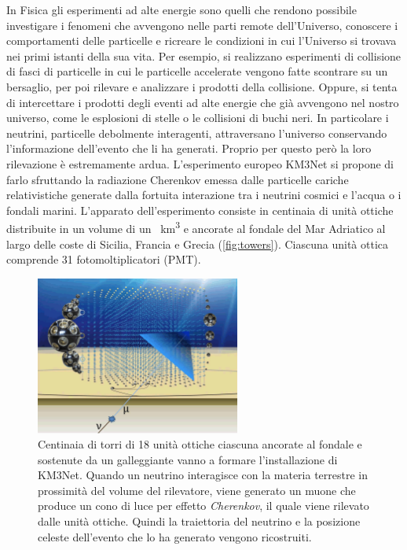 \documentclass[../main.tex]{subfiles}
\begin{document}
In Fisica gli esperimenti ad alte energie sono quelli che rendono possibile investigare i fenomeni che avvengono nelle parti remote dell'Universo, conoscere i comportamenti delle particelle e ricreare le condizioni in cui l'Universo si trovava nei primi istanti della sua vita. Per esempio, si realizzano esperimenti di collisione di fasci di particelle in cui le particelle accelerate vengono fatte scontrare su un bersaglio, per poi rilevare e analizzare i prodotti della collisione. Oppure, si tenta di intercettare i prodotti degli eventi ad alte energie che già avvengono nel nostro universo, come le esplosioni di stelle o le collisioni di buchi neri. In particolare i neutrini, particelle debolmente interagenti, attraversano l'universo conservando l'informazione dell'evento che li ha generati. Proprio per questo però la loro rilevazione è estremamente ardua. L'esperimento europeo KM3Net si propone di farlo sfruttando la radiazione Cherenkov emessa dalle particelle cariche relativistiche generate dalla fortuita interazione tra i neutrini cosmici e l'acqua o i fondali marini. L'apparato dell'esperimento consiste in centinaia di unità ottiche distribuite in un volume di un \SI{}{\km ^3} e ancorate al fondale del Mar Adriatico al largo delle coste di Sicilia, Francia e Grecia (\autoref{fig:towers}). Ciascuna unità ottica comprende 31 fotomoltiplicatori (PMT).

\begin{figure}[h!b]
    \centering
    \includegraphics[width=0.6\textwidth]{KM3NetTowers.png}
    \caption{\small Centinaia di torri di 18 unità ottiche ciascuna ancorate al fondale e sostenute da un galleggiante vanno a formare l'installazione di KM3Net. Quando un neutrino interagisce con la materia terrestre in prossimità del volume del rilevatore, viene generato un muone che produce un cono di luce per effetto \emph{Cherenkov}, il quale viene rilevato dalle unità ottiche. Quindi la traiettoria del neutrino e la posizione celeste dell'evento che lo ha generato vengono ricostruiti.
    \cite{km3}}
    \label{fig:towers}
\end{figure}
\end{document}

